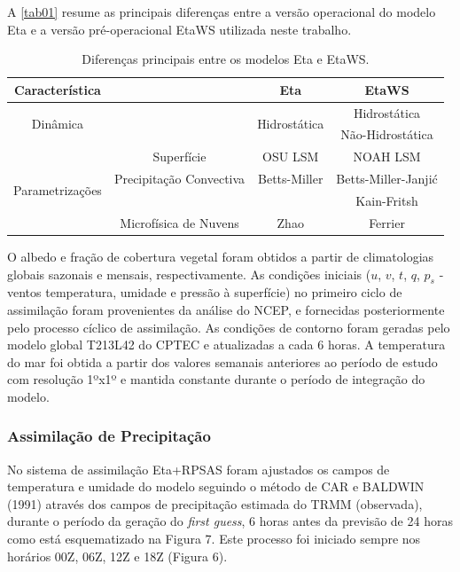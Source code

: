 A \autoref{tab01} resume as principais diferenças entre a versão operacional do modelo Eta e a versão pré-operacional EtaWS utilizada neste trabalho.

\begin{table}[!hbp]
\caption{Diferenças principais entre os modelos Eta e EtaWS.}
\label{tab01}
\centering
\begin{tabular}{c|c|c|c}
\hline
Característica                       &                         & Eta               & EtaWS              \\
\hline
\multirow{2}{2.8cm}{Dinâmica}        &                         & \multirow{2}{2.8cm}{Hidrostática}      & Hidrostática       \\
                                     &                         &                   & Não-Hidrostática   \\
\hline
                                     & Superfície              & OSU LSM           & NOAH LSM           \\ 
\multirow{2}{2.8cm}{Parametrizações} & Precipitação Convectiva & Betts-Miller      & Betts-Miller-Janjić\\
                                     &                         &                   & Kain-Fritsh        \\
                                     & Microfísica de Nuvens   & Zhao              & Ferrier            \\
\hline
\end{tabular}
\end{table}

O albedo e fração de cobertura vegetal foram obtidos a partir de climatologias globais sazonais e mensais, respectivamente. As condições iniciais ($u$, $v$, $t$, $q$, $p_{s}$ - ventos temperatura, umidade e pressão à superfície) no primeiro ciclo de assimilação foram provenientes da análise do NCEP, e fornecidas posteriormente pelo processo cíclico de assimilação.  As condições de contorno foram geradas pelo modelo global T213L42 do CPTEC e atualizadas a cada 6 horas. A temperatura do mar foi obtida a partir dos valores semanais anteriores ao período de estudo com resolução 1ºx1º e mantida constante durante o período de integração do modelo.


\subsubsection{Assimilação de Precipitação}

No sistema de assimilação Eta+RPSAS foram ajustados os campos de temperatura e umidade do modelo seguindo o método de CAR e BALDWIN (1991) através dos campos de precipitação estimada do TRMM (observada), durante o período da geração do \textit{first guess},  6 horas antes da previsão de 24 horas como está esquematizado na Figura 7. Este processo foi iniciado sempre nos horários 00Z, 06Z, 12Z e 18Z (Figura 6).

